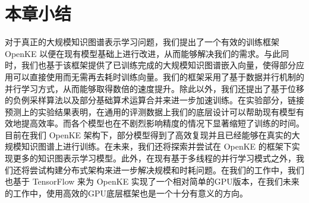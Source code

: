 \section{本章小结}

对于真正的大规模知识图谱表示学习问题，我们提出了一个有效的训练框架 OpenKE 以便在现有模型基础上进行改进，从而能够解决我们的需求。与此同时，我们也基于该框架提供了已训练完成的大规模知识图谱嵌入向量，使得部分应用可以直接使用而无需再去耗时训练向量。我们的框架采用了基于数据并行机制的并行学习方式，从而能够取得数倍的速度提升。除此以外，我们还提出了基于位移的负例采样算法以及部分基础算术运算合并来进一步加速训练。在实验部分，链接预测上的实验结果表明，在通用的评测数据上我们的底层设计可以帮助现有模型有效地提高效率。而各个模型也在不剧烈影响精度的情况下显著缩短了训练的时间。目前在我们 OpenKE 架构下，部分模型得到了高效复现并且已经能够在真实的大规模知识图谱上进行训练。在未来，我们还将探索并尝试在 OpenKE 的框架下实现更多的知识图表示学习模型。此外，在现有基于多线程的并行学习模式之外，我们还将尝试构建分布式架构来进一步解决规模和时耗问题。在我们的工作中，我们也基于 TensorFlow 来为 OpenKE 实现了一个相对简单的GPU版本，在我们未来的工作中，使用高效的GPU底层框架也是一个十分有意义的方向。
